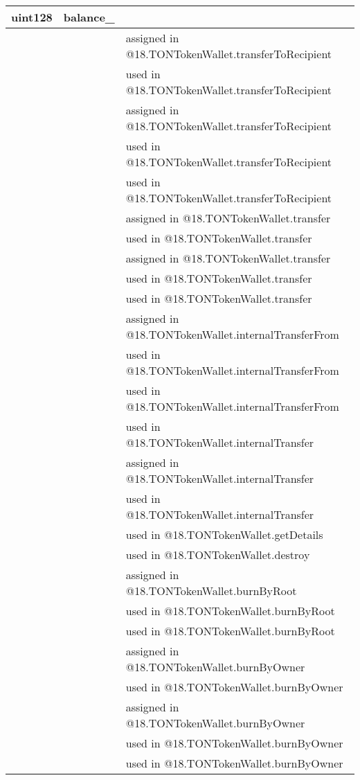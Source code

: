 \ifsoltables
\noindent\begin{tabular}{|l|l|p{5cm}|}\hline
uint128 & balance\_{} &  \\\hline
 & & assigned in @18.TONTokenWallet.transferToRecipient\\\hline
 & & used in @18.TONTokenWallet.transferToRecipient\\\hline
 & & assigned in @18.TONTokenWallet.transferToRecipient\\\hline
 & & used in @18.TONTokenWallet.transferToRecipient\\\hline
 & & used in @18.TONTokenWallet.transferToRecipient\\\hline
 & & assigned in @18.TONTokenWallet.transfer\\\hline
 & & used in @18.TONTokenWallet.transfer\\\hline
 & & assigned in @18.TONTokenWallet.transfer\\\hline
 & & used in @18.TONTokenWallet.transfer\\\hline
 & & used in @18.TONTokenWallet.transfer\\\hline
 & & assigned in @18.TONTokenWallet.internalTransferFrom\\\hline
 & & used in @18.TONTokenWallet.internalTransferFrom\\\hline
 & & used in @18.TONTokenWallet.internalTransferFrom\\\hline
 & & used in @18.TONTokenWallet.internalTransfer\\\hline
 & & assigned in @18.TONTokenWallet.internalTransfer\\\hline
 & & used in @18.TONTokenWallet.internalTransfer\\\hline
 & & used in @18.TONTokenWallet.getDetails\\\hline
 & & used in @18.TONTokenWallet.destroy\\\hline
 & & assigned in @18.TONTokenWallet.burnByRoot\\\hline
 & & used in @18.TONTokenWallet.burnByRoot\\\hline
 & & used in @18.TONTokenWallet.burnByRoot\\\hline
 & & assigned in @18.TONTokenWallet.burnByOwner\\\hline
 & & used in @18.TONTokenWallet.burnByOwner\\\hline
 & & assigned in @18.TONTokenWallet.burnByOwner\\\hline
 & & used in @18.TONTokenWallet.burnByOwner\\\hline
 & & used in @18.TONTokenWallet.burnByOwner\\\hline

\end{tabular}
